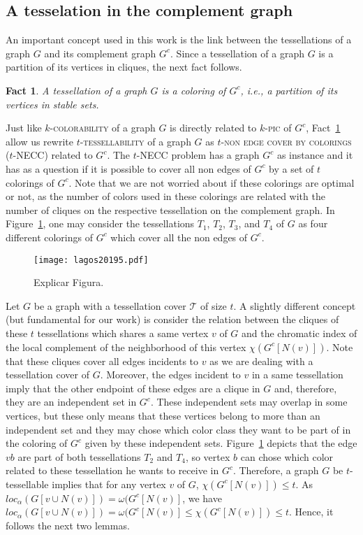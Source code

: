 \documentclass[9pt]{entcs} \usepackage{entcsmacro}
\newtheorem{fac}{Fact}[section]
\begin{document}
\subsection{A tesselation in the complement graph}
\label{sub:22}  

An important concept used in this work is the link between the tessellations of a graph $G$ and its complement graph $G^c$.
Since a tessellation of a graph $G$ is a partition of its vertices in cliques, the next fact follows.

\begin{fac}
\label{fact:one}
A tessellation of a graph $G$ is a coloring of $G^c$, i.e., a partition of its vertices in stable sets.
\end{fac}

Just like \textsc{$k$-colorability} of a graph $G$ is directly related to \textsc{$k$-pic} of $G^c$, Fact~\ref{fact:one} allow us rewrite \textsc{$t$-tessellability} of a graph $G$ as \textsc{$t$-non edge cover by colorings ($t$-NECC)} related to $G^c$. The \textsc{$t$-NECC} problem has a graph $G^c$ as instance and it has as a question if it is possible to cover all non edges of $G^c$ by a set of $t$ colorings of $G^c$. Note that we are not worried about if these colorings are optimal or not, as the number of colors used in these colorings are related with the number of cliques on the respective tessellation on the complement graph. In Figure~\ref{fig:mycielski}, one may consider  the tessellations $T_1$, $T_2$, $T_3$, and $T_4$ of $G$ as four different colorings of $G^c$ which cover all the non edges of $G^c$.

\begin{figure}
\centering
     \texttt{[image: lagos20195.pdf]}
     \caption{Explicar Figura. \label{fig:mycielski}}
\end{figure}

Let $G$ be a graph with a tessellation cover $\mathcal{T}$ of size $t$.
A slightly different concept  (but fundamental for our work) is consider the relation between the cliques of these $t$ tessellations which shares a same vertex $v$ of $G$ and the chromatic index of the local complement of the neighborhood of this vertex $\chi(G^c[N(v)])$.
Note that these cliques cover all edges incidents to $v$ as we are dealing with a tessellation cover of $G$.
Moreover, the edges incident to $v$ in a same tessellation imply that the other endpoint of these edges are a clique in $G$ and, therefore, they are an independent set in $G^c$. 
These independent sets may overlap in some vertices, but these only means that these vertices belong to more than an independent set and they may chose which color class they want to be part of in the coloring of $G^c$ given by these independent sets. Figure~\ref{fig:mycielski} depicts that the edge $vb$ are part of both tessellations $T_2$ and $T_4$, so vertex $b$ can chose which color related to these tessellation he wants to receive in $G^c$.
Therefore, a graph $G$ be $t$-tessellable implies that for any vertex $v$ of $G$, $\chi(G^c[N(v)]) \leq t$.
As $loc_\alpha(G[v \cup N(v)]) = \omega(G^c[N(v)]$, we have $loc_\alpha(G[v \cup N(v)]) = \omega(G^c[N(v)] \leq \chi(G^c[N(v)]) \leq t$. 
Hence, it follows the next two lemmas.
\end{document}
